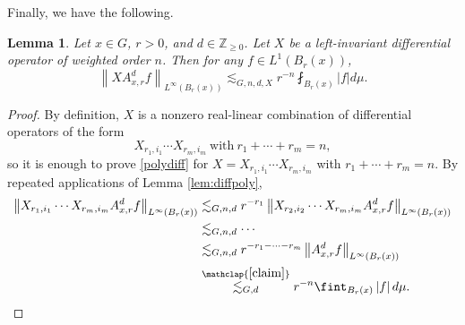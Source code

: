 \documentclass[11pt,reqno]{amsart}
\newtheorem{lemma}[theorem]{Lemma}
\newcommand{\1}{\mathbf 1}
\begin{document}
Finally, we have the following.
\begin{lemma}
    Let $x\in G$, $r>0$, and $d\in \mathbb{Z}_{\ge 0}$. Let $X$ be a left-invariant differential operator of weighted order $n$. Then for any $f\in L^1\left(B_{r}\left(x\right)\right)$,
    \begin{equation}\label{polydiff}
\left\|X A^d_{x,r}f\right\|_{L^\infty\left(B_r\left(x\right)\right)}\lesssim_{G,n, d,X}r^{-n}\fint_{B_r\left(x\right)}\left|f\right|d\mu.
\end{equation}
\end{lemma}
\begin{proof}
    By definition, $X$ is a nonzero real-linear combination of differential operators of the form
    \[
    X_{r_1,i_1}\cdots X_{r_m,i_m} \mathrm{~with~} r_1+\cdots+r_m=n,
    \]
    so it is enough to prove \eqref{polydiff} for $X=X_{r_1,i_1}\cdots X_{r_m,i_m}$ with $r_1+\cdots+r_m=n$. By repeated applications of Lemma \ref{lem:diffpoly},
    \begin{align*}
    \left\|X_{r_1,i_1}\cdots X_{r_m,i_m}A^d_{x,r}f\right\|_{L^\infty\left(B_r\left(x\right)\right)}&\lesssim_{G,n,d}r^{-r_1}\left\|X_{r_2,i_2}\cdots X_{r_m,i_m}A^d_{x,r}f\right\|_{L^\infty\left(B_r\left(x\right)\right)}\\
    &\lesssim_{G,n,d}\cdots\\
    &\lesssim_{G,n,d}r^{-r_1-\cdots-r_m}\left\|A^d_{x,r}f\right\|_{L^\infty\left(B_r\left(x\right)\right)}\\
    &\stackrel{\mathclap{\eqref{claim}}}{\lesssim_{G,d}}r^{-n}\fint_{B_r\left(x\right)}\left|f\right|d\mu.
    \end{align*}
\end{proof}

\end{document}
